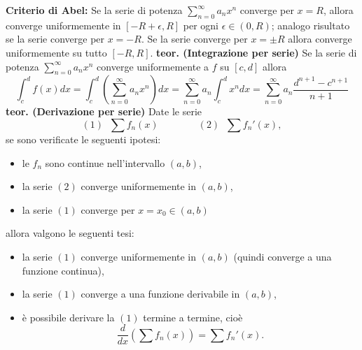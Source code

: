 \newline
\textbf{Criterio di Abel:} Se la serie di potenza $\sum_{n=0}^{\infty} a_n x^n$ converge per $x = R$, allora converge uniformemente in $[-R + \epsilon, R]$ per ogni $\epsilon \in (0,R)$; analogo risultato se la serie converge per $x = -R$. Se la serie converge per $x = \pm R$ allora converge uniformemente su tutto $[-R, R]$.\newline
\newline
\textbf{teor. (Integrazione per serie)}\newline
Se la serie di potenza $\sum_{n=0}^{\infty} a_n x^n$ converge uniformemente a $f$ su $[c,d]$ allora
\[
    \int_{c}^{d}f(x) dx = \int_{c}^{d}\left(\sum_{n=0}^{\infty}a_n x^n\right)dx = \sum_{n=0}^{\infty}a_n \int_{c}^{d}x^n dx = \sum_{n=0}^{\infty} a_n \frac{d^{n+1}- c^{n+1}}{n+1}
\]
\newline
\textbf{teor. (Derivazione per serie)}\newline
Date le serie
\[
    (1) \;\; \sum f_n(x) \quad \quad \quad \quad (2) \;\; \sum f_n'(x),
\]
se sono verificate le seguenti ipotesi:
\begin{itemize}
    \item le $f_n$ sono continue nell'intervallo $(a,b)$,
    \item la serie $(2)$ converge uniformemente in $(a,b)$,
    \item la serie $(1)$ converge per $x = x_0 \in (a,b)$  
\end{itemize}
allora valgono le seguenti tesi:
\begin{itemize}
    \item la serie $(1)$ converge uniformemente in $(a,b)$ (quindi converge a una funzione continua),
    \item la serie $(1)$ converge a una funzione derivabile in $(a,b)$,
    \item è possibile derivare la $(1)$ termine a termine, cioè
    \[
        \frac{d}{dx}\left(\sum f_n(x)\right) = \sum f_n'(x).
    \]
\end{itemize}
